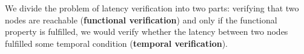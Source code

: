 



We divide the problem of latency verification into two parts: 
verifying that two nodes are reachable (\textbf{functional verification}) and only if 
the functional property is fulfilled, we would verify whether the latency between 
two nodes fulfilled some temporal condition (\textbf{temporal verification}).